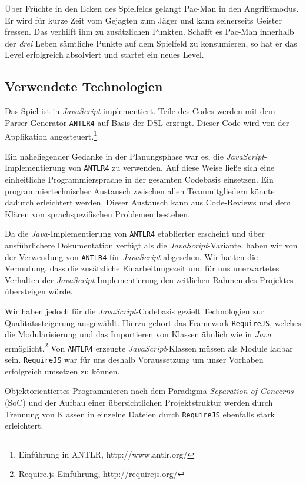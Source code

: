 \documentclass[conference]{IEEEtran}
\begin{document}
Über Früchte in den Ecken des Spielfelds gelangt Pac-Man in den Angriffsmodus. Er wird für kurze Zeit vom Gejagten zum Jäger und kann seinerseits Geister fressen. Das verhilft ihm zu zusätzlichen Punkten. Schafft es Pac-Man innerhalb der \emph{drei} Leben sämtliche Punkte auf dem Spielfeld zu konsumieren, so hat er das Level erfolgreich absolviert und startet ein neues Level.


\subsection{Verwendete Technologien}
Das Spiel ist in \emph{JavaScript} implementiert. Teile des Codes werden mit dem Parser-Generator \texttt{ANTLR4} auf Basis der DSL erzeugt. Dieser Code wird von der Applikation angesteuert.\footnote[1]{Einführung in ANTLR, http://www.antlr.org/}

Ein naheliegender Gedanke in der Planungsphase war es, die \emph{JavaScript}-Implementierung von \texttt{ANTLR4} zu verwenden. Auf diese Weise ließe sich eine einheitliche Programmiersprache in der gesamten Codebasis einsetzen. Ein programmiertechnischer Austausch zwischen allen Teammitgliedern könnte dadurch erleichtert werden. Dieser Austausch kann aus Code-Reviews und dem Klären von sprachspezifischen Problemen bestehen.

Da die \emph{Java}-Implementierung von \texttt{ANTLR4} etablierter erscheint und über ausführlichere Dokumentation verfügt als die \emph{JavaScript}-Variante, haben wir von der Verwendung von \texttt{ANTLR4} für \emph{JavaScript} abgesehen. Wir hatten die Vermutung, dass die zusätzliche Einarbeitungszeit und für uns unerwartetes Verhalten der \emph{JavaScript}-Implementierung den zeitlichen Rahmen des Projektes übersteigen würde.

Wir haben jedoch für die \emph{JavaScript}-Codebasis gezielt Technologien zur Qualitätssteigerung ausgewählt. Hierzu gehört das Framework \texttt{RequireJS}, welches die Modularisierung und das Importieren von Klassen ähnlich wie in \emph{Java} ermöglicht.\footnote[2]{Require.js Einführung, http://requirejs.org/} Von \texttt{ANTLR4} erzeugte \emph{JavaScript}-Klassen müssen als Module ladbar sein. \texttt{RequireJS} war für uns deshalb Voraussetzung um unser  Vorhaben erfolgreich umsetzen zu können.

Objektorientiertes Programmieren nach dem Paradigma \emph{Separation of Concerns} (SoC) und der Aufbau einer übersichtlichen Projektstruktur werden durch Trennung von Klassen in einzelne Dateien durch \texttt{RequireJS} ebenfalls stark erleichtert.
\end{document}
